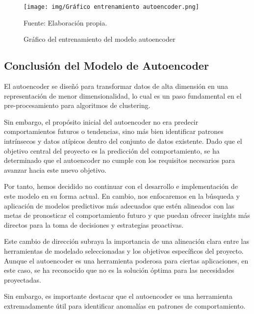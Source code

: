 \begin{figure}[H]
    \begin{minipage}[t]{0.9\textwidth}
        \caption{Gráfico del entrenamiento del modelo autoencoder}
        \label{gráfico_autoencoder}        
    \end{minipage}

    \vspace{10pt}

    \begin{minipage}[b]{0.9\textwidth}
        \centering
        \texttt{[image: img/Gráfico entrenamiento autoencoder.png]}        
    \end{minipage}

    \begin{minipage}[t]{0.9\textwidth}
        Fuente: Elaboración propia.
    \end{minipage}
\end{figure}

\subsection{Conclusión del Modelo de Autoencoder}

El autoencoder se diseñó para transformar datos de alta dimensión en una representación de menor dimensionalidad, lo cual es un paso fundamental en el pre-procesamiento para algoritmos de clustering.

Sin embargo, el propósito inicial del autoencoder no era predecir comportamientos futuros o tendencias, sino más bien identificar patrones intrínsecos y datos atípicos dentro del conjunto de datos existente. Dado que el objetivo central del proyecto es la predicción del comportamiento, se ha determinado que el autoencoder no cumple con los requisitos necesarios para avanzar hacia este nuevo objetivo.

Por tanto, hemos decidido no continuar con el desarrollo e implementación de este modelo en su forma actual. En cambio, nos enfocaremos en la búsqueda y aplicación de modelos predictivos más adecuados que estén alineados con las metas de pronosticar el comportamiento futuro y que puedan ofrecer insights más directos para la toma de decisiones y estrategias proactivas.

Este cambio de dirección subraya la importancia de una alineación clara entre las herramientas de modelado seleccionadas y los objetivos específicos del proyecto. Aunque el autoencoder es una herramienta poderosa para ciertas aplicaciones, en este caso, se ha reconocido que no es la solución óptima para las necesidades proyectadas.

Sin embargo, es importante destacar que el autoencoder es una herramienta extremadamente útil para identificar anomalías en patrones de comportamiento.
